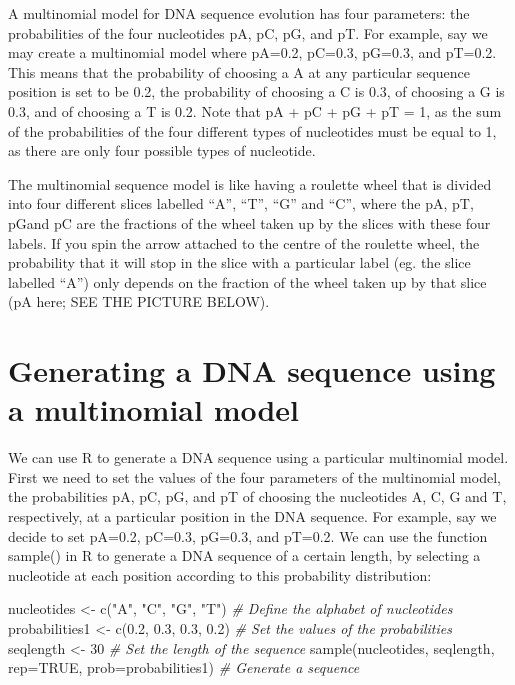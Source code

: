 \documentclass[
]{book}
\newenvironment{Shaded}{\begin{snugshade}}{\end{snugshade}}
\newcommand{\AttributeTok}[1]{\textcolor[rgb]{0.77,0.63,0.00}{#1}}
\newcommand{\CommentTok}[1]{\textcolor[rgb]{0.56,0.35,0.01}{\textit{#1}}}
\newcommand{\ConstantTok}[1]{\textcolor[rgb]{0.00,0.00,0.00}{#1}}
\newcommand{\DecValTok}[1]{\textcolor[rgb]{0.00,0.00,0.81}{#1}}
\newcommand{\FloatTok}[1]{\textcolor[rgb]{0.00,0.00,0.81}{#1}}
\newcommand{\FunctionTok}[1]{\textcolor[rgb]{0.00,0.00,0.00}{#1}}
\newcommand{\NormalTok}[1]{#1}
\newcommand{\OtherTok}[1]{\textcolor[rgb]{0.56,0.35,0.01}{#1}}
\newcommand{\StringTok}[1]{\textcolor[rgb]{0.31,0.60,0.02}{#1}}
\begin{document}
A multinomial model for DNA sequence evolution has four parameters: the probabilities of the four nucleotides pA, pC, pG, and pT. For example, say we may create a multinomial model where pA=0.2, pC=0.3, pG=0.3, and pT=0.2. This means that the probability of choosing a A at any particular sequence position is set to be 0.2, the probability of choosing a C is 0.3, of choosing a G is 0.3, and of choosing a T is 0.2. Note that pA + pC + pG + pT = 1, as the sum of the probabilities of the four different types of nucleotides must be equal to 1, as there are only four possible types of nucleotide.

The multinomial sequence model is like having a roulette wheel that is divided into four different slices labelled ``A'', ``T'', ``G'' and ``C'', where the pA, pT, pGand pC are the fractions of the wheel taken up by the slices with these four labels. If you spin the arrow attached to the centre of the roulette wheel, the probability that it will stop in the slice with a particular label (eg. the slice labelled ``A'') only depends on the fraction of the wheel taken up by that slice (pA here; SEE THE PICTURE BELOW).

\hypertarget{generating-a-dna-sequence-using-a-multinomial-model}{%
\section{Generating a DNA sequence using a multinomial model}\label{generating-a-dna-sequence-using-a-multinomial-model}}

We can use R to generate a DNA sequence using a particular multinomial model. First we need to set the values of the four parameters of the multinomial model, the probabilities pA, pC, pG, and pT of choosing the nucleotides A, C, G and T, respectively, at a particular position in the DNA sequence. For example, say we decide to set pA=0.2, pC=0.3, pG=0.3, and pT=0.2. We can use the function sample() in R to generate a DNA sequence of a certain length, by selecting a nucleotide at each position according to this probability distribution:

\begin{Shaded}
\begin{Highlighting}[]
\NormalTok{nucleotides    }\OtherTok{\textless{}{-}} \FunctionTok{c}\NormalTok{(}\StringTok{"A"}\NormalTok{, }\StringTok{"C"}\NormalTok{, }\StringTok{"G"}\NormalTok{, }\StringTok{"T"}\NormalTok{) }\CommentTok{\# Define the alphabet of nucleotides}
\NormalTok{probabilities1 }\OtherTok{\textless{}{-}} \FunctionTok{c}\NormalTok{(}\FloatTok{0.2}\NormalTok{, }\FloatTok{0.3}\NormalTok{, }\FloatTok{0.3}\NormalTok{, }\FloatTok{0.2}\NormalTok{) }\CommentTok{\# Set the values of the probabilities}
\NormalTok{seqlength      }\OtherTok{\textless{}{-}} \DecValTok{30}                    \CommentTok{\# Set the length of the sequence}
\FunctionTok{sample}\NormalTok{(nucleotides, seqlength, }\AttributeTok{rep=}\ConstantTok{TRUE}\NormalTok{, }\AttributeTok{prob=}\NormalTok{probabilities1) }\CommentTok{\# Generate a sequence}
\end{Highlighting}
\end{Shaded}
\end{document}

